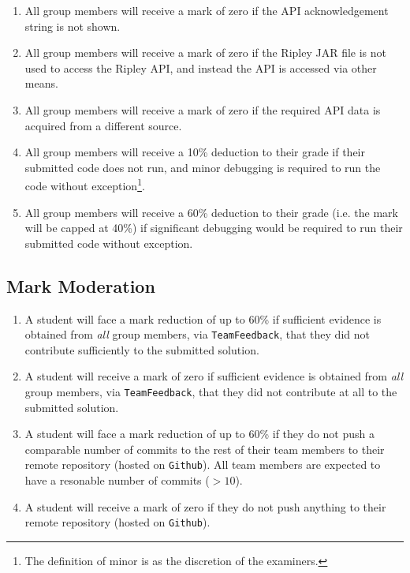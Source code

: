 \documentclass[11pt]{article}
\begin{document}
\begin{enumerate}

	\item All group members will receive a mark of zero if the API acknowledgement string is not shown.
	
	\item All group members will receive a mark of zero if the Ripley JAR file is not used to access the Ripley API, and instead the API is accessed via other means.
	
	\item All group members will receive a mark of zero if the required API data is acquired from a different source.

	\item All group members will receive a 10\% deduction to their grade if their submitted code does not run, and minor debugging is required to run the code without exception\footnote{The definition of minor is as the discretion of the examiners.}.
	
	\item All group members will receive a 60\% deduction to their grade (i.e. the mark will be capped at 40\%) if significant debugging would be required to run their submitted code without exception.
	
\end{enumerate}

\subsection{Mark Moderation}

\begin{enumerate}

	\item A student will face a mark reduction of up to 60\% if sufficient evidence is obtained from \emph{all} group members, via \texttt{TeamFeedback}, that they did not contribute sufficiently to the submitted solution.
	
	\item A student will receive a mark of zero if sufficient evidence is obtained from \emph{all} group members, via \texttt{TeamFeedback}, that they did not contribute at all to the submitted solution.
	
	\item A student will face a mark reduction of up to 60\% if they do not push a comparable number of commits to the rest of their team members to their remote repository (hosted on \texttt{Github}). All team members are expected to have a resonable number of commits ($> 10$).
	
	\item A student will receive a mark of zero if they do not push anything to their remote repository (hosted on \texttt{Github}).

\end{enumerate}
\end{document}
